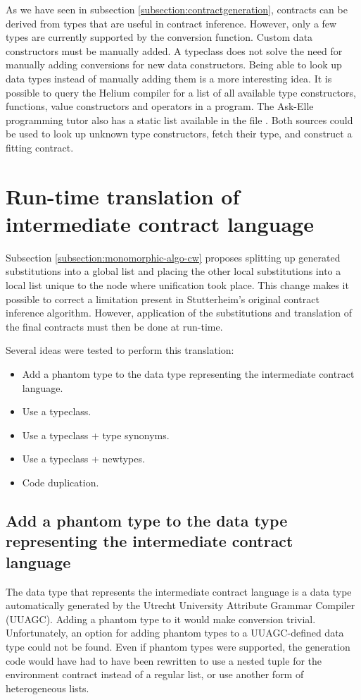 \documentclass[10pt]{report}
\newcommand{\code}[1]{%
  {%
   \setlength{\fboxsep}{-2\fboxrule}%
   \fcolorbox{black}{light-gray}{\hspace{1.5pt}\strut\texttt{#1}\hspace{1.5pt}}%
  }%
}
\begin{document}
As we have seen in subsection \ref{subsection:contractgeneration}, contracts can be derived from types that are useful in contract inference.
However, only a few types are currently supported by the conversion function.
Custom data constructors must be manually added.
A typeclass does not solve the need for manually adding conversions for new data constructors. 
Being able to look up data types instead of manually adding them is a more interesting idea.
It is possible to query the Helium compiler for a list of all available type constructors, functions, value constructors and operators in a program.
The Ask-Elle programming tutor also has a static list available in the file \code{Domain\textbackslash FP\textbackslash HeliumImportEnvs.hs}.
Both sources could be used to look up unknown type constructors, fetch their type, and construct a fitting contract.

\section{Run-time translation of intermediate contract language}
\label{futurework:runtimetranslation}

Subsection \ref{subsection:monomorphic-algo-cw} proposes splitting up generated substitutions into a global list and placing the other local substitutions into a local list unique to the node where unification took place.
This change makes it possible to correct a limitation present in Stutterheim's original contract inference algorithm.
However, application of the substitutions and translation of the final contracts must then be done at run-time.

Several ideas were tested to perform this translation:
\begin{itemize}
	\item Add a phantom type to the data type representing the intermediate contract language.
	\item Use a typeclass.
	\item Use a typeclass + type synonyms.
	\item Use a typeclass + newtypes.
	\item Code duplication.
\end{itemize}

\subsection{Add a phantom type to the data type representing the intermediate contract language}
The data type that represents the intermediate contract language is a data type automatically generated by the Utrecht University Attribute Grammar Compiler (UUAGC). 
Adding a phantom type to it would make conversion trivial.
Unfortunately, an option for adding phantom types to a UUAGC-defined data type could not be found.
Even if phantom types were supported, the generation code would have had to have been rewritten to use a nested tuple for the environment contract instead of a regular list, or use another form of heterogeneous lists.
\end{document}
